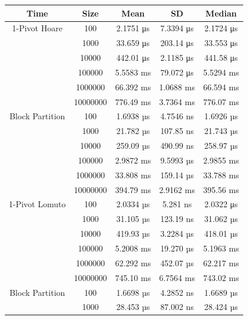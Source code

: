 \documentclass[a4paper,oneside,12pt]{book}
\begin{document}
\begin{center}
    \small
    \begin{tabular}{ |c c | c c c| }
        \hline
        Time            & Size     & Mean         & SD          & Median \\
        \hline
        1-Pivot Hoare   & 100      & 2.1751 μs    & 7.3394 μs   & 2.1724 μs \\
                        & 1000     & 33.659 μs    & 203.14 μs   & 33.553 μs \\
                        & 10000    & 442.01 μs    & 2.1185 μs   & 441.58 μs \\
                        & 100000   & 5.5583 ms    & 79.072 μs   & 5.5294 ms \\
                        & 1000000  & 66.392 ms    & 1.0688 ms   & 66.594 ms \\
                        & 10000000 & 776.49 ms    & 3.7364 ms   & 776.07 ms \\
        Block Partition & 100      & 1.6938 µs    & 4.7546 ns   & 1.6926 µs \\
                        & 1000     & 21.782 µs    & 107.85 ns   & 21.743 µs \\
                        & 10000    & 259.09 µs    & 490.99 ns   & 258.97 µs \\
                        & 100000   & 2.9872 ms    & 9.5993 µs   & 2.9855 ms \\
                        & 1000000  & 33.808 ms 	  & 159.14 µs   & 33.788 ms \\
                        & 10000000 & 394.79 ms    & 2.9162 ms   & 395.56 ms \\
        \hline
        1-Pivot Lomuto  & 100      & 2.0334 µs    & 5.281 ns    & 2.0322 μs \\
                        & 1000     & 31.105 µs    & 123.19 ns   & 31.062 µs \\
                        & 10000    & 419.93 µs    & 3.2284 µs   & 418.01 µs \\
                        & 100000   & 5.2008 ms    & 19.270 µs   & 5.1963 ms \\
                        & 1000000  & 62.292 ms    & 452.07 µs   & 62.217 ms \\
                        & 10000000 & 745.10 ms    & 6.7564 ms   & 743.02 ms \\
        Block Partition & 100      & 1.6698 µs    & 4.2852 ns   & 1.6689 µs \\
                        & 1000     & 28.453 µs    & 87.002 ns   & 28.424 µs \\

\end{tabular}
\end{center}
\end{document}
